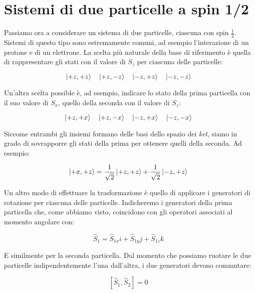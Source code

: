 \section{Sistemi di due particelle a spin 1/2}

	Passiamo ora a considerare un sistema di due particelle, ciascuna con spin $\tfrac{1}{2}$. Sistemi di questo tipo sono estremamente comuni, ad esempio l'interazione di un protone e di un elettrone. La scelta pi\`u naturale della base di riferimento \`e quella di rappresentare gli stati con il valore di $S_z$ per ciascuna delle particelle:

	\begin{equation} \label{eq:twoPartState}
		\ket{+z, +z} \quad \ket{+z, -z} \quad \ket{-z, +z} \quad \ket{-z, -z}
	\end{equation}	

Un'altra scelta possible \`e, ad esempio, indicare lo stato della prima particella con il suo valore di $S_x$, quello della seconda con il valore di $S_z$:

	\begin{equation}
		\ket{+z, +x} \quad \ket{+z, -x} \quad \ket{-z, +x} \quad \ket{-z, -x}
	\end{equation}

Siccome entrambi gli insiemi formano delle basi dello spazio dei \textit{ket}, siamo in grado di sovrapporre gli stati della prima per ottenere quelli della seconda. Ad esempio:

	\begin{equation}
		\ket{+x, +z} = \frac{1}{\sqrt{2}}\ket{+z, +z} + \frac{1}{\sqrt{2}}\ket{-z, +z}
	\end{equation}	

Un altro modo di effettuare la trasformazione \`e quello di applicare i generatori di rotazione per ciascuna delle particelle. Indicheremo i generatori della prima particella che, come abbiamo visto, coincidono con gli operatori associati al momento angolare con:

	\begin{equation}
		\hat{S}_1 = \hat{S}_{1x} i + \hat{S}_{1y} j + \hat{S}_{1z} k
	\end{equation}

E similmente per la seconda particella. Dal momento che possiamo ruotare le due particelle indipendentemente l'una dall'altra, i due generatori devono commutare:

	\begin{equation}
		\left [ \hat{S}_1, \hat{S}_2 \right ] = 0
	\end{equation}

